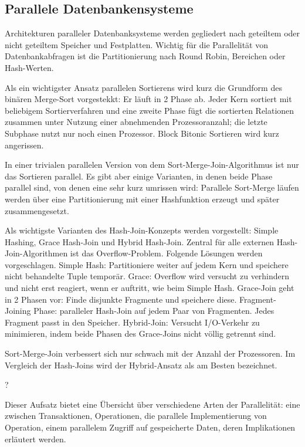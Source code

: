 \documentclass[a4paper,12pt,twoside]{article}
\begin{document}
\subsection{Parallele Datenbankensysteme}

\textbf{}

Architekturen paralleler Datenbanksysteme werden gegliedert nach geteiltem oder nicht geteiltem Speicher und Festplatten. Wichtig für die Parallelität von Datenbankabfragen ist die Partitionierung nach Round Robin, Bereichen oder Hash-Werten.

Als ein wichtigster Ansatz parallelen Sortierens wird kurz die Grundform des binären Merge-Sort vorgestekkt: Er läuft in 2 Phase ab. Jeder Kern sortiert mit beliebigem Sortierverfahren und eine zweite Phase fügt die sortierten Relationen zusammen unter Nutzung einer abnehmenden Prozessoranzahl; die letzte Subphase nutzt nur noch einen Prozessor. Block Bitonic Sortieren wird kurz angerissen. 

In einer trivialen parallelen Version von dem Sort-Merge-Join-Algorithmus ist nur das Sortieren parallel. Es gibt aber einige Varianten, in denen beide Phase parallel sind, von denen eine sehr kurz umrissen wird: Parallele Sort-Merge läufen werden über eine Partitionierung mit einer Hashfunktion erzeugt und später zusammengesetzt.

Als wichtigste Varianten des Hash-Join-Konzepts werden vorgestellt: Simple Hashing, Grace Hash-Join und Hybrid Hash-Join. Zentral für alle externen Hash-Join-Algorithmen ist das Overflow-Problem. Folgende Lösungen werden vorgeschlagen. Simple Hash: Partitioniere weiter auf jedem Kern und speichere nicht behandelte Tuple temporär. Grace: Overflow wird versucht zu verhindern und nicht erst reagiert, wenn er auftritt, wie beim Simple Hash. Grace-Join geht in 2 Phasen vor: Finde disjunkte Fragmente und speichere diese. Fragment-Joining Phase: paralleler Hash-Join auf jedem Paar von Fragmenten. Jedes Fragment passt in den Speicher. Hybrid-Join: Versucht I/O-Verkehr zu minimieren, indem beide Phasen des Grace-Joins nicht völlig getrennt sind.

Sort-Merge-Join verbessert sich nur schwach mit der Anzahl der Prozessoren. Im Vergleich der Hash-Joins wird der Hybrid-Ansatz als am Besten bezeichnet.

\textbf{} ?

Dieser Aufsatz bietet eine Übersicht über verschiedene Arten der Parallelität: eine zwischen Transaktionen, Operationen, die parallele Implementierung von Operation, einem parallelem Zugriff auf gespeicherte Daten, deren Implikationen erläutert werden.
\end{document}
